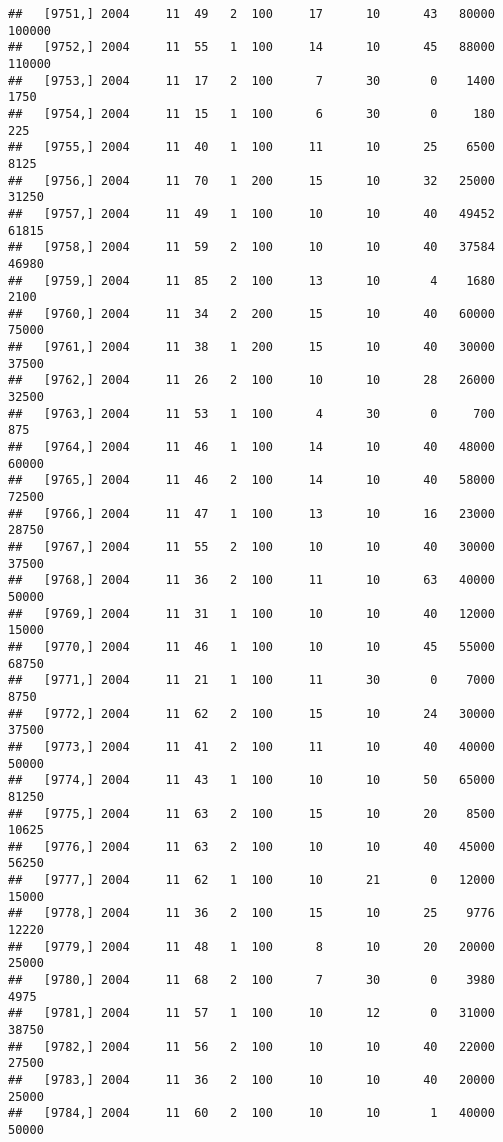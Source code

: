 \documentclass{article}\usepackage[]{graphicx}\usepackage[]{color}
\makeatletter
\newenvironment{kframe}{%
 \def\at@end@of@kframe{}%
 \ifinner\ifhmode%
  \def\at@end@of@kframe{\end{minipage}}%
  \begin{minipage}{\columnwidth}%
 \fi\fi%
 \def\FrameCommand##1{\hskip\@totalleftmargin \hskip-\fboxsep
 \colorbox{shadecolor}{##1}\hskip-\fboxsep
     \hskip-\linewidth \hskip-\@totalleftmargin \hskip\columnwidth}%
 \MakeFramed {\advance\hsize-\width
   \@totalleftmargin\z@ \linewidth\hsize
   \@setminipage}}%
 {\par\unskip\endMakeFramed%
 \at@end@of@kframe}
\newenvironment{knitrout}{}{} %
\makeatother
\begin{document}
\begin{knitrout}
\begin{kframe}
\begin{verbatim}
##   [9751,] 2004     11  49   2  100     17      10      43   80000  100000
##   [9752,] 2004     11  55   1  100     14      10      45   88000  110000
##   [9753,] 2004     11  17   2  100      7      30       0    1400    1750
##   [9754,] 2004     11  15   1  100      6      30       0     180     225
##   [9755,] 2004     11  40   1  100     11      10      25    6500    8125
##   [9756,] 2004     11  70   1  200     15      10      32   25000   31250
##   [9757,] 2004     11  49   1  100     10      10      40   49452   61815
##   [9758,] 2004     11  59   2  100     10      10      40   37584   46980
##   [9759,] 2004     11  85   2  100     13      10       4    1680    2100
##   [9760,] 2004     11  34   2  200     15      10      40   60000   75000
##   [9761,] 2004     11  38   1  200     15      10      40   30000   37500
##   [9762,] 2004     11  26   2  100     10      10      28   26000   32500
##   [9763,] 2004     11  53   1  100      4      30       0     700     875
##   [9764,] 2004     11  46   1  100     14      10      40   48000   60000
##   [9765,] 2004     11  46   2  100     14      10      40   58000   72500
##   [9766,] 2004     11  47   1  100     13      10      16   23000   28750
##   [9767,] 2004     11  55   2  100     10      10      40   30000   37500
##   [9768,] 2004     11  36   2  100     11      10      63   40000   50000
##   [9769,] 2004     11  31   1  100     10      10      40   12000   15000
##   [9770,] 2004     11  46   1  100     10      10      45   55000   68750
##   [9771,] 2004     11  21   1  100     11      30       0    7000    8750
##   [9772,] 2004     11  62   2  100     15      10      24   30000   37500
##   [9773,] 2004     11  41   2  100     11      10      40   40000   50000
##   [9774,] 2004     11  43   1  100     10      10      50   65000   81250
##   [9775,] 2004     11  63   2  100     15      10      20    8500   10625
##   [9776,] 2004     11  63   2  100     10      10      40   45000   56250
##   [9777,] 2004     11  62   1  100     10      21       0   12000   15000
##   [9778,] 2004     11  36   2  100     15      10      25    9776   12220
##   [9779,] 2004     11  48   1  100      8      10      20   20000   25000
##   [9780,] 2004     11  68   2  100      7      30       0    3980    4975
##   [9781,] 2004     11  57   1  100     10      12       0   31000   38750
##   [9782,] 2004     11  56   2  100     10      10      40   22000   27500
##   [9783,] 2004     11  36   2  100     10      10      40   20000   25000
##   [9784,] 2004     11  60   2  100     10      10       1   40000   50000

\end{verbatim}
\end{kframe}
\end{knitrout}
\end{document}
